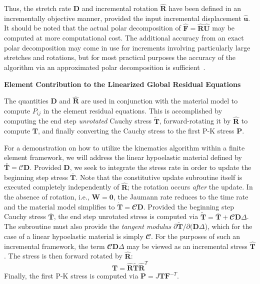 Thus, the stretch rate $\bm{D}$ and incremental rotation $\hat{\bm{R}}$ have been defined in an incrementally objective manner, provided the input incremental displacement $\hat{\bm{u}}$.  It should be noted that the actual polar decomposition of $\hat{\bm{F}} = \hat{\bm{R}}\hat{\bm{U}}$ may be computed at more computational cost. The additional accuracy from an exact polar decomposition may come in use for increments involving particularly large stretches and rotations, but for most practical purposes the accuracy of the algorithm via an approximated polar decomposition is sufficient~\cite{rashid_1993}.

\textbf{Element Contribution to the Linearized Global Residual Equations}

The quantities $\bm{D}$ and $\hat{\bm{R}}$ are used in conjunction with the material model to compute $P_{ij}$ in the element residual equations. This is accomplished by computing the end step \textit{unrotated} Cauchy stress $\tilde{\bm{T}}$, forward-rotating it by $\hat{\bm{R}}$ to compute $\bm{T}$, and finally converting the Cauchy stress to the first P-K stress $\bm{P}$.

For a demonstration on how to utilize the kinematics algorithm within a finite element framework, we will address the linear hypoelastic material defined by $\overset{\circ}{\bm{T}} = \bm{\mathcal{C}}\bm{D}$. Provided $\bm{D}$, we seek to integrate the stress rate in order to update the beginning step stress $\overline{\bm{T}}$. Note that the constitutive update subroutine itself is executed completely independently of $\hat{\bm{R}}$; the rotation occurs \textit{after} the update. In the absence of rotation, i.e., $\bm{W} = \bm{0}$, the Jaumann rate reduces to the time rate and the material model simplifies to $\dot{\bm{T}} = \mathbfcal{C}\bm{D}$. Provided the beginning step Cauchy stress $\overline{\bm{T}}$, the end step unrotated stress is computed via $\tilde{\bm{T}} = \overline{\bm{T}} + \mathbfcal{C}\bm{D}\Delta$. The subroutine must also provide the \textit{tangent modulus} $\partial\tilde{\bm{T}}/\partial({\bm{D}\Delta}$), which for the case of a linear hypoelastic material is simply $\mathbfcal{C}$. For the purposes of such an incremental framework, the term $\mathbfcal{C}\bm{D}\Delta$ may be viewed as an incremental stress $\hat{\bm{T}}$. The stress is then forward rotated by $\hat{\bm{R}}$:
\begin{equation}
\bm{T} = \hat{\bm{R}}\tilde{\bm{T}}\hat{\bm{R}}^T
\end{equation}
Finally, the first P-K stress is computed via $\bm{P} = J\bm{T}\bm{F}^{-T}$.

